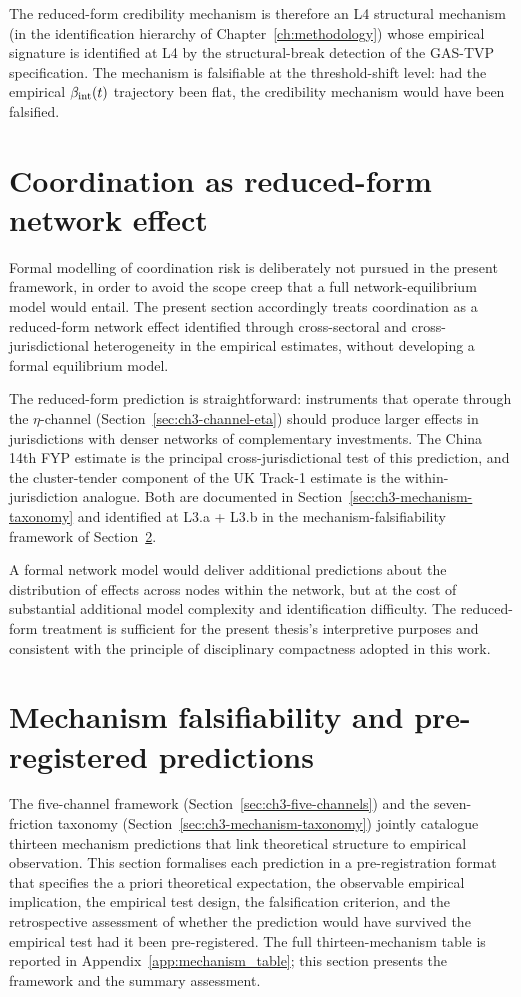 The reduced-form credibility mechanism is therefore an L4 structural mechanism (in the identification hierarchy of Chapter~\ref{ch:methodology}) whose empirical signature is identified at L4 by the structural-break detection of the GAS-TVP specification. The mechanism is falsifiable at the threshold-shift level: had the empirical $\beta_{\mathrm{int}}(t)$ trajectory been flat, the credibility mechanism would have been falsified.

\section{Coordination as reduced-form network effect}
\label{sec:ch3-coordination-reduced-form}

Formal modelling of coordination risk is deliberately not pursued in the present framework, in order to avoid the scope creep that a full network-equilibrium model would entail. The present section accordingly treats coordination as a reduced-form network effect identified through cross-sectoral and cross-jurisdictional heterogeneity in the empirical estimates, without developing a formal equilibrium model.

The reduced-form prediction is straightforward: instruments that operate through the $\eta$-channel (Section~\ref{sec:ch3-channel-eta}) should produce larger effects in jurisdictions with denser networks of complementary investments. The China 14th FYP estimate is the principal cross-jurisdictional test of this prediction, and the cluster-tender component of the UK Track-1 estimate is the within-jurisdiction analogue. Both are documented in Section~\ref{sec:ch3-mechanism-taxonomy} and identified at L3.a + L3.b in the mechanism-falsifiability framework of Section~\ref{sec:ch3-mechanism-falsifiability}.

A formal network model would deliver additional predictions about the distribution of effects across nodes within the network, but at the cost of substantial additional model complexity and identification difficulty. The reduced-form treatment is sufficient for the present thesis's interpretive purposes and consistent with the principle of disciplinary compactness adopted in this work.

\section{Mechanism falsifiability and pre-registered predictions}
\label{sec:ch3-mechanism-falsifiability}

The five-channel framework (Section~\ref{sec:ch3-five-channels}) and the seven-friction taxonomy (Section~\ref{sec:ch3-mechanism-taxonomy}) jointly catalogue thirteen mechanism predictions that link theoretical structure to empirical observation. This section formalises each prediction in a pre-registration format that specifies the a priori theoretical expectation, the observable empirical implication, the empirical test design, the falsification criterion, and the retrospective assessment of whether the prediction would have survived the empirical test had it been pre-registered. The full thirteen-mechanism table is reported in Appendix~\ref{app:mechanism_table}; this section presents the framework and the summary assessment.

